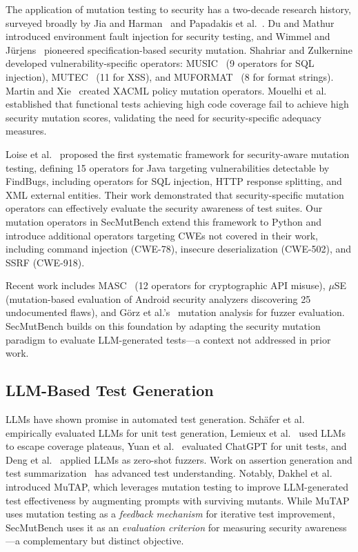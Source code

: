 \documentclass[sigconf,anonymous,review]{acmart}
\begin{document}
The application of mutation testing to security has a two-decade research history, surveyed broadly by Jia and Harman~\cite{jia2011analysis} and Papadakis et al.~\cite{papadakis2019mutation}. Du and Mathur~\cite{du2000testing} introduced environment fault injection for security testing, and Wimmel and J\"{u}rjens~\cite{wimmel2002specification} pioneered specification-based security mutation. Shahriar and Zulkernine developed vulnerability-specific operators: MUSIC~\cite{shahriar2008music} (9 operators for SQL injection), MUTEC~\cite{shahriar2009mutec} (11 for XSS), and MUFORMAT~\cite{shahriar2008muformat} (8 for format strings). Martin and Xie~\cite{martin2007xacml} created XACML policy mutation operators. Mouelhi et al.~\cite{mouelhi2007mutation} established that functional tests achieving high code coverage fail to achieve high security mutation scores, validating the need for security-specific adequacy measures.

Loise et al.~\cite{loise2017security} proposed the first systematic framework for security-aware mutation testing, defining 15 operators for Java targeting vulnerabilities detectable by FindBugs, including operators for SQL injection, HTTP response splitting, and XML external entities. Their work demonstrated that security-specific mutation operators can effectively evaluate the security awareness of test suites. Our mutation operators in SecMutBench extend this framework to Python and introduce additional operators targeting CWEs not covered in their work, including command injection (CWE-78), insecure deserialization (CWE-502), and SSRF (CWE-918).

Recent work includes MASC~\cite{ami2023masc} (12 operators for cryptographic API misuse), $\mu$SE~\cite{bonett2018muse} (mutation-based evaluation of Android security analyzers discovering 25 undocumented flaws), and G{\"o}rz et al.'s~\cite{gorz2023mutation} mutation analysis for fuzzer evaluation. SecMutBench builds on this foundation by adapting the security mutation paradigm to evaluate LLM-generated tests---a context not addressed in prior work.

\subsection{LLM-Based Test Generation}

LLMs have shown promise in automated test generation. Sch\"{a}fer et al.~\cite{schafer2024empirical} empirically evaluated LLMs for unit test generation, Lemieux et al.~\cite{lemieux2023codamosa} used LLMs to escape coverage plateaus, Yuan et al.~\cite{yuan2024no} evaluated ChatGPT for unit tests, and Deng et al.~\cite{deng2023large} applied LLMs as zero-shot fuzzers. Work on assertion generation and test summarization~\cite{nashid2024assertion} has advanced test understanding. Notably, Dakhel et al.~\cite{dakhel2023mutap} introduced MuTAP, which leverages mutation testing to improve LLM-generated test effectiveness by augmenting prompts with surviving mutants. While MuTAP uses mutation testing as a \emph{feedback mechanism} for iterative test improvement, SecMutBench uses it as an \emph{evaluation criterion} for measuring security awareness---a complementary but distinct objective.
\end{document}
